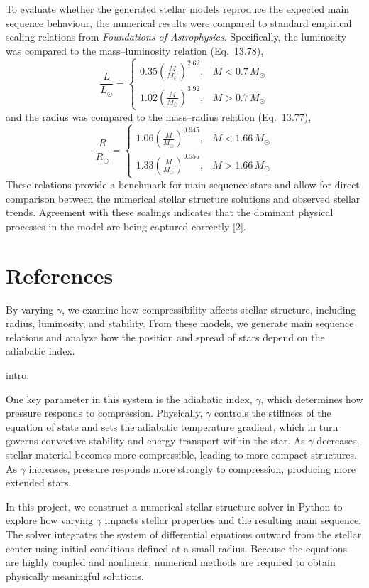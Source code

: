 \documentclass[12pt]{article}
\begin{document}
To evaluate whether the generated stellar models reproduce the expected main sequence behaviour, the numerical results were compared to standard empirical scaling relations from \textit{Foundations of Astrophysics}. Specifically, the luminosity was compared to the mass--luminosity relation (Eq.~13.78),
\[
\frac{L}{L_\odot} =
\begin{cases}
0.35\left(\frac{M}{M_\odot}\right)^{2.62}, & M < 0.7\,M_\odot \\
1.02\left(\frac{M}{M_\odot}\right)^{3.92}, & M > 0.7\,M_\odot
\end{cases}
\]
and the radius was compared to the mass--radius relation (Eq.~13.77),
\[
\frac{R}{R_\odot} =
\begin{cases}
1.06\left(\frac{M}{M_\odot}\right)^{0.945}, & M < 1.66\,M_\odot \\
1.33\left(\frac{M}{M_\odot}\right)^{0.555}, & M > 1.66\,M_\odot
\end{cases}
\]
These relations provide a benchmark for main sequence stars and allow for direct comparison between the numerical stellar structure solutions and observed stellar trends. Agreement with these scalings indicates that the dominant physical processes in the model are being captured correctly [2]. 

\clearpage
\section{References}



\clearpage


By varying $\gamma$, we examine how compressibility affects stellar structure, including radius, luminosity, and stability. From these models, we generate main sequence relations and analyze how the position and spread of stars depend on the adiabatic index.


intro: 


One key parameter in this system is the adiabatic index, $\gamma$, which determines how pressure responds to compression. Physically, $\gamma$ controls the stiffness of the equation of state and sets the adiabatic temperature gradient, which in turn governs convective stability and energy transport within the star. As $\gamma$ decreases, stellar material becomes more compressible, leading to more compact structures. As $\gamma$ increases, pressure responds more strongly to compression, producing more extended stars.

In this project, we construct a numerical stellar structure solver in Python to explore how varying $\gamma$ impacts stellar properties and the resulting main sequence. The solver integrates the system of differential equations outward from the stellar center using initial conditions defined at a small radius. Because the equations are highly coupled and nonlinear, numerical methods are required to obtain physically meaningful solutions.
\end{document}
